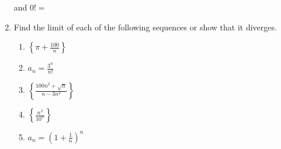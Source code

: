 \documentclass[11pt,fleqn]{article}
\newcommand{\ds}{\displaystyle}
\begin{document}
\begin{enumerate}
\vspace{0.5in}
and $0!=$
\medskip
\item Find the limit of each of the following sequences or show that it diverges. 
	\begin{enumerate}
	\item $\displaystyle \left\{\pi + \frac{100}{n} \right\}$
	\vfill
	\item $\ds a_n=\frac{3^n}{n!}$
	\vfill
	\item $\displaystyle \left\{\frac{100n^2+\sqrt{n}}{n-3n^2} \right\}$
	\vfill
	\item $\displaystyle \left\{\frac{n^2}{10^n} \right\}$
	\vfill
	\item $\displaystyle a_n = \left(1+\frac{1}{n}\right)^n$
	\vfill
	\end{enumerate}

\end{enumerate}
\end{document}
